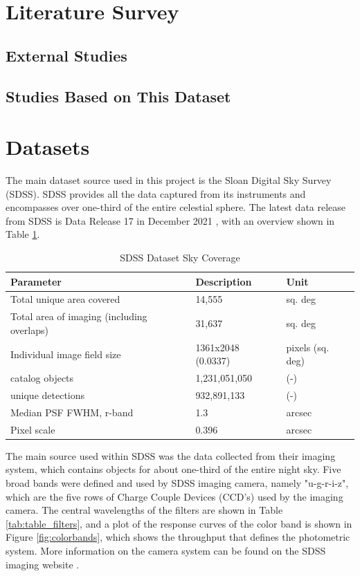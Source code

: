 \documentclass[11pt,sigconf]{acmart}
\begin{document}
\section{Literature Survey}

\subsection{External Studies}

\subsection{Studies Based on This Dataset}




\section{Datasets}

The main dataset source used in this project is the Sloan Digital Sky Survey (SDSS). 
SDSS provides all the data captured from its instruments and encompasses over one-third
of the entire celestial sphere. The latest data release from SDSS is Data Release 17 in
December 2021 \cite{abdurro}, with an overview shown in Table \ref{tab:table_SDSS}. 
\\
\begin{table}[]
  \begin{tabular}{ |p{4.0cm}|p{2.0cm}|p{1.3cm}|  } \hline
   \textbf{Parameter} & \textbf{Description} & \textbf{Unit}  \\ \hline
   Total unique area covered & 14,555  & sq. deg \\ \hline
   Total area of imaging (including overlaps) & 31,637 & sq. deg \\ \hline
   Individual image field size & 1361x2048 (0.0337) & pixels (sq. deg) \\ \hline
   catalog objects & 1,231,051,050 & (-) \\ \hline
   unique detections & 932,891,133 & (-) \\ \hline
   Median PSF FWHM, r-band & 1.3 & arcsec \\ \hline
   Pixel scale & 0.396 & arcsec \\ \hline
  \end{tabular}
  \caption{\label{tab:table_SDSS}SDSS Dataset Sky Coverage \cite{abdurro}}
  \end{table}

The main source used within SDSS was the data collected from their imaging system, 
which contains objects for about one-third of the entire night sky. Five broad 
bands were defined and used by SDSS imaging camera, namely "u-g-r-i-z", which 
are the five rows of Charge Couple Devices (CCD's) used by the imaging camera. 
The central wavelengths of the filters are shown in Table \ref{tab:table_filters}, 
and a plot of the response curves of the color band is shown in 
Figure \ref{fig:colorbands}, which shows the throughput that defines the photometric 
system. More information on the camera system can be found on the SDSS 
imaging website \cite{sdss_imaging}. 
\end{document}
